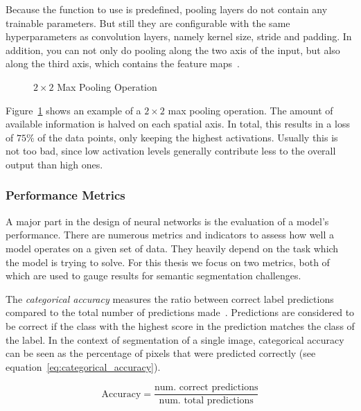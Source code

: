 Because the function to use is predefined, pooling layers do not contain any trainable parameters. But still they are configurable with the same hyperparameters as convolution layers, namely kernel size, stride and padding. In addition, you can not only do pooling along the two axis of the input, but also along the third axis, which contains the feature maps~\cite[p.~370]{praxiseinstieg_ml17}.

\begin{figure}[h]
    \centering
    
    \caption[$2\times 2$ Max Pooling Operation]{$2\times 2$ Max Pooling Operation~\cite[modified]{github-latex20}}
    \label{fig:pooling}
\end{figure}

Figure~\ref{fig:pooling} shows an example of a $2\times 2$ max pooling operation. The amount of available information is halved on each spatial axis. In total, this results in a loss of $75\%$ of the data points, only keeping the highest activations. Usually this is not too bad, since low activation levels generally contribute less to the overall output than high ones.

\subsubsection{Performance Metrics}
\label{sec:metrics}
A major part in the design of neural networks is the evaluation of a model's performance. There are numerous metrics and indicators to assess how well a model operates on a given set of data. They heavily depend on the task which the model is trying to solve. For this thesis we focus on two metrics, both of which are used to gauge results for semantic segmentation challenges.

The \emph{categorical accuracy} measures the ratio between correct label predictions compared to the total number of predictions made~\cite{tf_whitepaper15}. Predictions are considered to be correct if the class with the highest score in the prediction matches the class of the label. In the context of segmentation of a single image, categorical accuracy can be seen as the percentage of pixels that were predicted correctly (see equation~\ref{eq:categorical_accuracy}).

\begin{equation}
    \label{eq:categorical_accuracy}
    \text{Accuracy} = \frac{\text{num. correct predictions}}{\text{num. total predictions}}
\end{equation}

